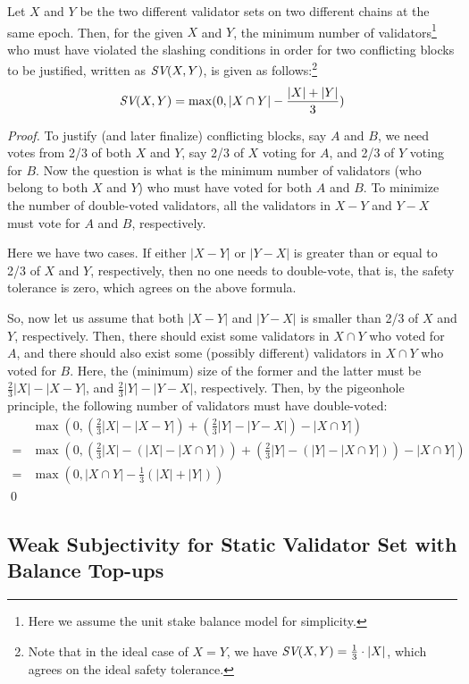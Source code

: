 \begin{lemma}\label{lem:safety-tolerance}
Let $X$ and $Y$ be the two different validator sets on two different chains at the same epoch.
Then, for the given $X$ and $Y$, the minimum number of validators\footnote{Here we assume the unit stake balance model for simplicity.} who must have violated the slashing conditions in order for two conflicting blocks to be justified, written as $\textit{SV}(X,Y)$, is given as follows:\footnote{Note that in the ideal case of $X = Y$, we have $\textit{SV}(X,Y) = \frac{1}{3} \cdot |X|$, which agrees on the ideal safety tolerance.}
\[
\textit{SV}(X,Y) = \max(0, |X \cap Y| - \frac{|X| + |Y|}{3})
\]
\end{lemma}
\begin{proof}
To justify (and later finalize) conflicting blocks, say $A$ and $B$, we need votes from 2/3 of both $X$ and $Y$, say 2/3 of $X$ voting for $A$, and 2/3 of $Y$ voting for $B$.  Now the question is what is the minimum number of validators (who belong to both $X$ and $Y$) who must have voted for both $A$ and $B$.  To minimize the number of double-voted validators, all the validators in $X-Y$ and $Y-X$ must vote for $A$ and $B$, respectively.

Here we have two cases.  If either $|X-Y|$ or $|Y-X|$ is greater than or equal to 2/3 of $X$ and $Y$, respectively, then no one needs to double-vote, that is, the safety tolerance is zero, which agrees on the above formula.

So, now let us assume that both $|X-Y|$ and $|Y-X|$ is smaller than 2/3 of $X$ and $Y$, respectively.  Then, there should exist some validators in $X \cap Y$ who voted for $A$, and there should also exist some (possibly different) validators in $X \cap Y$ who voted for $B$.  Here, the (minimum) size of the former and the latter must be $\frac{2}{3} |X| - |X-Y|$, and $\frac{2}{3} |Y| - |Y-X|$, respectively.  Then, by the pigeonhole principle, the following number of validators must have double-voted:
\begin{align*}
& \max(0, (\frac{2}{3} |X| - |X-Y|) + (\frac{2}{3} |Y| - |Y-X|) - |X \cap Y|) \\
= & \max(0, (\frac{2}{3} |X| - (|X| - |X \cap Y|)) + (\frac{2}{3} |Y| - (|Y| - |X \cap Y|)) - |X \cap Y|) \\
= & \max(0, |X \cap Y| - \frac{1}{3} (|X| + |Y|))
\end{align*}
\qed
\end{proof}

\subsection{Weak Subjectivity for Static Validator Set with Balance Top-ups}

